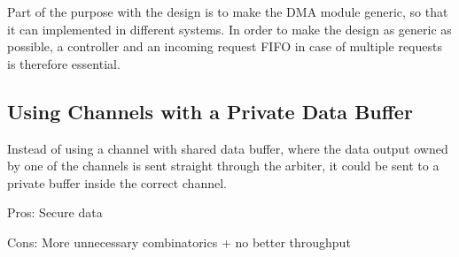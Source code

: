 Part of the purpose with the design is to make the DMA module generic, so that it can implemented in different systems.
In order to make the design as generic as possible, a controller and an incoming request FIFO
in case of multiple requests is therefore essential.

\subsection{Using Channels with a Private Data Buffer}
Instead of using a channel with shared data buffer, where the data output owned by
one of the channels is sent straight through the arbiter, it could be sent to a
private buffer inside the correct channel.

Pros: Secure data

Cons: More unnecessary combinatorics + no better throughput

